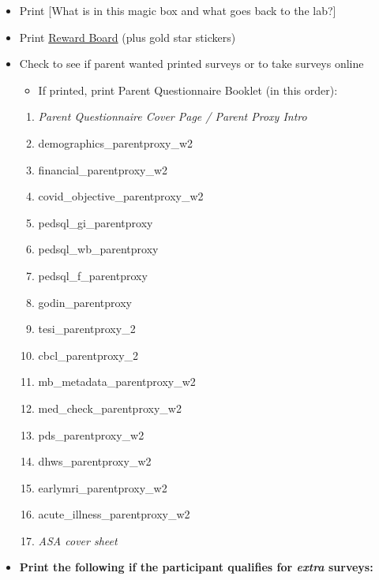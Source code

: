 \documentclass[
]{book}
\providecommand{\tightlist}{%
  \setlength{\itemsep}{0pt}\setlength{\parskip}{0pt}}
\begin{document}
\begin{itemize}
\item
  Print {[}What is in this magic box and what goes back to the lab?{]}
\item
  Print \href{https://ucla.app.box.com/file/668504120930}{Reward Board} (plus gold star stickers)
\item
  Check to see if parent wanted printed surveys or to take surveys online

  \begin{itemize}
  \tightlist
  \item
    If printed, print Parent Questionnaire Booklet (in this order):
  \end{itemize}

  \begin{enumerate}
  \def\labelenumi{\arabic{enumi}.}
  \tightlist
  \item
    \emph{Parent Questionnaire Cover Page / Parent Proxy Intro}
  \item
    demographics\_parentproxy\_w2
  \item
    financial\_parentproxy\_w2
  \item
    covid\_objective\_parentproxy\_w2
  \item
    pedsql\_gi\_parentproxy
  \item
    pedsql\_wb\_parentproxy
  \item
    pedsql\_f\_parentproxy
  \item
    godin\_parentproxy\\
  \item
    tesi\_parentproxy\_2
  \item
    cbcl\_parentproxy\_2
  \item
    mb\_metadata\_parentproxy\_w2
  \item
    med\_check\_parentproxy\_w2
  \item
    pds\_parentproxy\_w2
  \item
    dhws\_parentproxy\_w2
  \item
    earlymri\_parentproxy\_w2
  \item
    acute\_illness\_parentproxy\_w2
  \item
    \emph{ASA cover sheet}
  \end{enumerate}
\item
  \textbf{Print the following if the participant qualifies for \emph{extra} surveys:}


\end{itemize}
\end{document}
